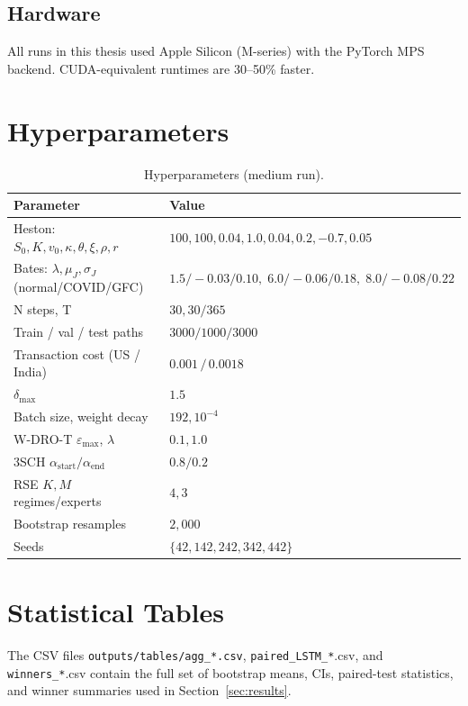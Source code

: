 \documentclass[11pt,a4paper]{article}
\begin{document}
\subsection{Hardware}
All runs in this thesis used Apple Silicon (M-series) with the PyTorch MPS
backend.  CUDA-equivalent runtimes are 30--50\% faster.

\section{Hyperparameters}\label{app:hparams}

\begin{table}[h]
\centering\small
\caption{Hyperparameters (medium run).}
\begin{tabular}{ll}\toprule
Parameter & Value \\\midrule
Heston: $S_0,K,v_0,\kappa,\theta,\xi,\rho,r$ & $100,100,0.04,1.0,0.04,0.2,-0.7,0.05$ \\
Bates: $\lambda,\mu_J,\sigma_J$ (normal/COVID/GFC) & $1.5/-0.03/0.10,\;6.0/-0.06/0.18,\;8.0/-0.08/0.22$ \\
N steps, T & $30,30/365$ \\
Train / val / test paths & $3000/1000/3000$ \\
Transaction cost (US / India) & $0.001\,/\,0.0018$ \\
$\delta_{\max}$ & $1.5$ \\
Batch size, weight decay & $192,10^{-4}$ \\
W-DRO-T $\varepsilon_{\max}$, $\lambda$ & $0.1, 1.0$ \\
3SCH $\alpha_{\text{start}}/\alpha_{\text{end}}$ & $0.8/0.2$ \\
RSE $K, M$ regimes/experts & $4,3$ \\
Bootstrap resamples & $2{,}000$ \\
Seeds & $\{42,142,242,342,442\}$ \\
\bottomrule
\end{tabular}
\end{table}

\section{Statistical Tables}\label{app:stats}

The CSV files \texttt{outputs/tables/agg\_*.csv}, \texttt{paired\_LSTM\_*}.csv,
and \texttt{winners\_*}.csv contain the full set of bootstrap means, CIs,
paired-test statistics, and winner summaries used in
Section~\ref{sec:results}.
\end{document}
